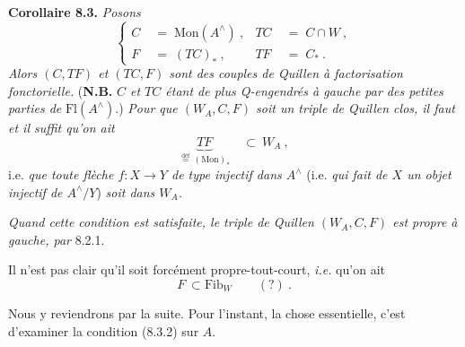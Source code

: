 \documentclass[11pt]{article}
\newcommand{\Fl}{\mathrm{Fl}}
\newcommand{\Mon}{\mathrm{Mon}}
\newcommand{\Fib}{\mathrm{Fib}}
\newcommand{\chap}{^{\wedge}}
\begin{document}
\textbf{Corollaire 8.3.} \textit{Posons}
\[
\left\{
\begin{aligned}
C \;&=\; \Mon(A\chap)\ , & TC \;&=\; C\cap W\ ,\\
F \;&=\; (TC)_*\ , & TF \;&=\; C_*\ .
\end{aligned}
\right.
\tag*{(8.3.1)}
\]
\textit{Alors $(C,TF)$ et $(TC,F)$ sont des couples de Quillen à factorisation fonctorielle.} (\textbf{N.B.} \textit{$C$ et $TC$ étant de plus Q-engendrés à gauche par des petites parties de} $\Fl(A\chap)$.) \textit{Pour que $(W_A,C,F)$ soit un triple de Quillen clos, il faut et il suffit qu'on ait}
\[
\underbrace{TF}_{\overset{\text{déf}}{=}\,(\Mon)_*} \quad\subset\ W_A\ ,
\tag*{(8.3.2)}
\]
i.e. \textit{que toute flèche $f:X\longrightarrow Y$ de type injectif dans $A\chap$} (i.e. \textit{qui fait de $X$ un objet injectif de $A\chap/Y$}) \textit{soit dans $W_A$.}

\textit{Quand cette condition est satisfaite, le triple de Quillen $(W_A,C,F)$ est propre à gauche, par} 8.2.1.

Il n'est pas clair qu'il soit forcément propre-tout-court, \textit{i.e.} qu'on ait
\[
F\ \subset \Fib_W \qquad (?)\ .
\tag*{(8.3.3)}
\]

Nous y reviendrons par la suite. Pour l'instant, la chose essentielle, c'est d'examiner la condition (8.3.2) sur $A$.
\end{document}
